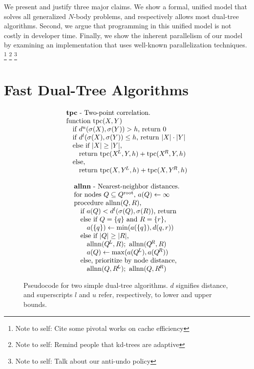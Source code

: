 \documentclass[twoside,leqno,twocolumn]{article}
\newcommand{\authornote}[1]{\footnote{Note to self: #1}}
\newcommand{\authorsnote}[1]{\authornote{#1}}
\newcommand{\psty}{}
\newcommand{\X}{\\ \psty}
\newcommand{\x}{\X \hspace{0.13in}}
\newcommand{\xx}{\X \hspace{0.26in}}
\newcommand{\kdroot}[1]{#1^{\text{root}}}
\newcommand{\kdleft}[1]{#1^{\!L}}
\newcommand{\kdright}[1]{#1^{\!R}}
\newcommand{\lo}[1]{#1^{l}}
\newcommand{\up}[1]{#1^{u}}
\newcommand{\distlo}{\lo{d}}
\newcommand{\distup}{\up{d}}
\newcommand{\dist}[2]{d(#1,#2)}
\newcommand{\outstat}{\sigma}
\begin{document}
We present and justify three major claims.
We show a formal, unified model that solves all generalized $N$-body problems, and respectively allows most dual-tree algorithms.
Second, we argue that programming in this unified model is not costly in developer time.
Finally, we show the inherent parallelism of our model by examining an implementation that uses well-known parallelization techniques.
\authorsnote{Cite some pivotal works on cache efficiency}
\authorsnote{Remind people that kd-trees are adaptive}
\authorsnote{Talk about our anti-undo policy}

\section{Fast Dual-Tree Algorithms}

\begin{figure}
  \begin{minipage}{6in}
    \begin{minipage}{2.5in}
      \begin{displaymath}
        \begin{array}[t]{l}
          \text{{\bf tpc} - Two-point correlation.}
          \X \text{function tpc}(X, Y)
          \x \text{if }\distup(\outstat(X), \outstat(Y)) > h\text{, return }0
          \x \text{if }\distlo(\outstat(X), \outstat(Y)) \leq h\text{, return } |X| \cdot |Y|
          \x \text{else if }|X| \geq |Y|\text{,}
          \xx \text{return tpc}(\kdleft{X}, Y, h) + \text{tpc}(\kdright{X}, Y, h)
          \x \text{else,}
          \xx \text{return tpc}(X, \kdleft{Y}, h) + \text{tpc}(X, \kdright{Y}, h)
        \end{array}
       \end{displaymath}
       \vspace{-.1in}
       \caption{\footnotesize \label{fig:allnntpc} Pseudocode for two simple dual-tree algorithms.
       $d$ signifies distance, and superscripts $l$ and $u$ refer, respectively, to lower and upper bounds.}
      \end{minipage}
      \begin{minipage}{3.0in}
       \begin{displaymath}
        \begin{array}[t]{l}
          \text{{\bf allnn} - Nearest-neighbor distances.}
          \X \text{for nodes }Q \subseteq \kdroot{Q}\text{, }a(Q) \gets \infty
          \X \text{procedure allnn}(Q,R)\text{,}
          \x \text{if }a(Q) < \distlo(\outstat(Q), \outstat(R))\text{, return}
          \x \text{else if }Q = \{q\} \text{ and } R = \{r\}\text{,}
          \xx a(\{q\}) \gets \min(a(\{q\}), \dist{q}{r})
          \x \text{else if }|Q| \geq |R|\text{,}
          \xx \text{allnn}(\kdleft{Q}, R); \text{ allnn}(\kdright{Q}, R)
          \xx a(Q) \gets \max(a(\kdleft{Q}), a(\kdright{Q}))
          \x \text{else, prioritize by node distance,}
          \xx \text{allnn}(Q, \kdleft{R}); \text{ allnn}(Q, \kdright{R})
        \end{array}
       \end{displaymath}
      \end{minipage}
  \end{minipage}
\end{figure}
\end{document}
